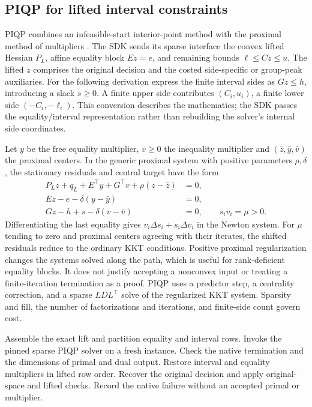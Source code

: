 \subsection{PIQP for lifted interval constraints}\label{sec:method-piqp}
PIQP combines an infeasible-start interior-point method with the proximal
method of multipliers \cite{piqp}. The SDK sends its sparse interface
the convex lifted Hessian \(P_L\), affine equality block \(Ez=e\), and
remaining bounds \(\ell\le Cz\le u\). The lifted \(z\) comprises the
original decision and the costed side-specific or group-peak
auxiliaries. For the following derivation express the finite interval
sides as \(Gz\le h\), introducing a slack \(s\ge0\). A finite upper
side contributes \((C_i,u_i)\), a finite lower side
\((-C_i,-\ell_i)\). This conversion describes the mathematics; the SDK
passes the equality/interval representation rather than rebuilding
the solver's internal side coordinates.

Let \(y\) be the free equality multiplier, \(v\ge0\) the inequality
multiplier and \((\bar z,\bar y,\bar v)\) the proximal centers. In the
generic proximal system with positive parameters \(\rho,\delta\),
the stationary residuals and central target have the form
\begin{align}
 P_Lz+q_L+E^\top y+G^\top v+\rho(z-\bar z)&=0,\label{eq:piqp-rd}\\
 Ez-e-\delta(y-\bar y)&=0,\label{eq:piqp-re}\\
 Gz-h+s-\delta(v-\bar v)&=0,\qquad s_i v_i=\mu>0.\label{eq:piqp-ri}
\end{align}
Differentiating the last equality gives
\(v_i\Delta s_i+s_i\Delta v_i\) in the Newton system.
For \(\mu\) tending to zero and proximal centers agreeing with their
iterates, the shifted residuals reduce to the ordinary KKT conditions.
Positive proximal regularization changes the systems solved along the
path, which is useful for rank-deficient equality blocks. It does not
justify accepting a nonconvex input or treating a finite-iteration
termination as a proof. PIQP uses a predictor step, a centrality
correction, and a sparse \(LDL^\top\) solve of the regularized KKT
system. Sparsity and fill, the number of factorizations and iterations,
and finite-side count govern cost.

\begin{algorithm}[ht]
\caption{PIQP on the sparse lifted interval representation}\label{alg:piqp-route}
\begin{algorithmic}[1]
\State Assemble the exact lift and partition equality and interval rows.
\State Invoke the pinned sparse PIQP solver on a fresh instance.
\State Check the native termination and the dimensions of primal and dual output.
 \State Restore interval and equality multipliers in lifted row order.
 \State Recover the original decision and apply original-space and lifted checks.
\Else
 \State Record the native failure without an accepted primal or multiplier.
\EndIf
\end{algorithmic}
\end{algorithm}


